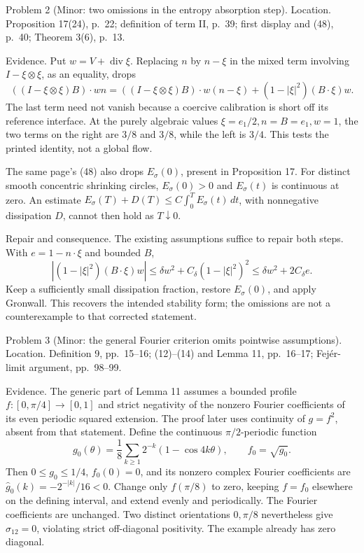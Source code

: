 \documentclass[10pt]{article}
\begin{document}
Problem 2 (Minor: two omissions in the entropy absorption step).  Location. Proposition 17(24), p. 22; definition of term II, p. 39; first display and (48), p. 40; Theorem 3(6), p. 13.\par
Evidence. Put \(w=V+\operatorname{div}\xi\). Replacing \(n\) by \(n-\xi\) in the mixed term involving \(I-\xi\otimes\xi\), as an equality, drops \[((I-\xi\otimes\xi)B)\cdot wn
 =((I-\xi\otimes\xi)B)\cdot w(n-\xi)
   +(1-|\xi|^2)(B\cdot\xi)w.                                  \tag{2.2}\] The last term need not vanish because a coercive calibration is short off its reference interface. At the purely algebraic values \(\xi=e_1/2,n=B=e_1,w=1\), the two terms on the right are \(3/8\) and \(3/8\), while the left is \(3/4\). This tests the printed identity, not a global flow.\par
The same page’s (48) also drops \(E_\sigma(0)\), present in Proposition 17. For distinct smooth concentric shrinking circles, \(E_\sigma(0)>0\) and \(E_\sigma(t)\) is continuous at zero. An estimate \(E_\sigma(T)+D(T)\le C\int_0^T E_\sigma(t)\,dt\), with nonnegative dissipation \(D\), cannot then hold as \(T\downarrow0\).\par
Repair and consequence. The existing assumptions suffice to repair both steps. With \(e=1-n\cdot\xi\) and bounded \(B\), \[|(1-|\xi|^2)(B\cdot\xi)w|
 \le\delta w^2+C_\delta(1-|\xi|^2)^2
 \le\delta w^2+2C_\delta e.\] Keep a sufficiently small dissipation fraction, restore \(E_\sigma(0)\), and apply Gronwall. This recovers the intended stability form; the omissions are not a counterexample to that corrected statement.\par
Problem 3 (Minor: the general Fourier criterion omits pointwise assumptions).  Location. Definition 9, pp. 15–16; (12)–(14) and Lemma 11, pp. 16–17; Fejér-limit argument, pp. 98–99.\par
Evidence. The generic part of Lemma 11 assumes a bounded profile \(f:[0,\pi/4]\to[0,1]\) and strict negativity of the nonzero Fourier coefficients of its even periodic squared extension. The proof later uses continuity of \(g=f^2\), absent from that statement. Define the continuous \(\pi/2\)-periodic function \[g_0(\theta)=\frac18\sum_{k\ge1}2^{-k}(1-\cos4k\theta),\qquad f_0=\sqrt{g_0}.\] Then \(0\le g_0\le1/4\), \(f_0(0)=0\), and its nonzero complex Fourier coefficients are \(\widehat g_0(k)=-2^{-|k|}/16<0\). Change only \(f(\pi/8)\) to zero, keeping \(f=f_0\) elsewhere on the defining interval, and extend evenly and periodically. The Fourier coefficients are unchanged. Two distinct orientations \(0,\pi/8\) nevertheless give \(\sigma_{12}=0\), violating strict off-diagonal positivity. The example already has zero diagonal.\par
\end{document}
